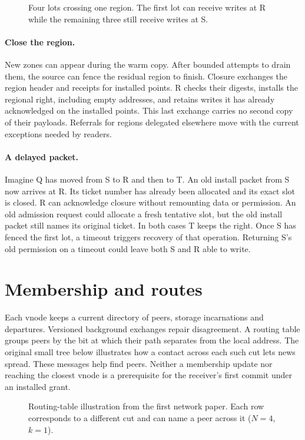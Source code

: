 \documentclass[11pt]{article}
\begin{document}
\begin{figure}[H]
    \centering
    \caption{Four lots crossing one region. The first lot can receive writes at R while the remaining three still receive writes at S.}
\end{figure}

\paragraph{Close the region.}
New zones can appear during the warm copy. After bounded attempts to drain them, the source can fence the residual region to finish. Closure exchanges the region header and receipts for installed points. R checks their digests, installs the regional right, including empty addresses, and retains writes it has already acknowledged on the installed points. This last exchange carries no second copy of their payloads. Referrals for regions delegated elsewhere move with the current exceptions needed by readers.

\paragraph{A delayed packet.}
Imagine Q has moved from S to R and then to T. An old install packet from S now arrives at R. Its ticket number has already been allocated and its exact slot is closed. R can acknowledge closure without remounting data or permission. An old admission request could allocate a fresh tentative slot, but the old install packet still names its original ticket. In both cases T keeps the right. Once S has fenced the first lot, a timeout triggers recovery of that operation. Returning S's old permission on a timeout could leave both S and R able to write.

\section{Membership and routes}
Each vnode keeps a current directory of peers, storage incarnations and departures. Versioned background exchanges repair disagreement. A routing table groups peers by the bit at which their path separates from the local address. The original small tree below illustrates how a contact across each such cut lets news spread. These messages help find peers. Neither a membership update nor reaching the closest vnode is a prerequisite for the receiver's first commit under an installed grant.

\begin{figure}[H]
    \centering
    \caption{Routing-table illustration from the first network paper. Each row corresponds to a different cut and can name a peer across it ($N=4$, $k=1$).}
\end{figure}
\end{document}
